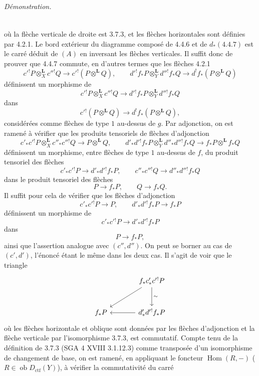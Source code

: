 \documentclass[11pt]{article}
\newenvironment{prooftext}[1][Proof]{\par\noindent\emph{#1.}\ }{\par\medskip}
\DeclareMathOperator{\Hom}{Hom}
\newcommand{\ob}{\operatorname{ob}}
\providecommand{\Dctf}{D_{\mathrm{ctf}}}
\providecommand{\Dctf}{D_{\mathrm{ctf}}}
\providecommand{\Hom}{\operatorname{Hom}}
\providecommand{\ob}{\operatorname{ob}}
\providecommand{\Hom}{\operatorname{Hom}}
\begin{document}
\begin{prooftext}[Démonstration]
\begin{equation}
\begin{tikzcd}[column sep=large,row sep=large]
\end{tikzcd}
\end{equation}
où la flèche verticale de droite est 3.7.3, et les flèches horizontales sont définies par 4.2.1. Le bord extérieur du diagramme composé de 4.4.6 et de $d_*(4.4.7)$ est le carré déduit de $(A)$ en inversant les flèches verticales. Il suffit donc de prouver que 4.4.7 commute, en d'autres termes que les flèches 4.2.1
\[
c'{}^!P\otimes_X^{\mathbf L}c''{}^!Q\longrightarrow c'{}^!(P\otimes^{\mathbf L}Q),\qquad
d'{}^!f_*P\otimes_Y^{\mathbf L}d''{}^!f_*Q\longrightarrow d^!f_*(P\otimes^{\mathbf L}Q)
\]
définissent un morphisme de
\[
c'{}^!P\otimes_X^{\mathbf L}c''{}^!Q\longrightarrow d'{}^!f_*P\otimes_Y^{\mathbf L}d''{}^!f_*Q
\]
dans
\[
c'{}^!(P\otimes^{\mathbf L}Q)\longrightarrow d^!f_*(P\otimes^{\mathbf L}Q),
\]
considérées comme flèches de type $1$ au-dessus de $g$. Par adjonction, on est ramené à vérifier que les produits tensoriels de flèches d'adjonction
\[
c'_*c'{}^!P\otimes_X^{\mathbf L}c''_*c''{}^!Q\longrightarrow P\otimes^{\mathbf L}Q,
\qquad
d'_*d'{}^!f_*P\otimes_Y^{\mathbf L}d''_*d''{}^!f_*Q
\longrightarrow f_*P\otimes^{\mathbf L}f_*Q
\]
définissent un morphisme, entre flèches de type $1$ au-dessus de $f$, du produit tensoriel des flèches
\[
c'_*c'{}^!P\longrightarrow d'_*d'{}^!f_*P,\qquad
c''_*c''{}^!Q\longrightarrow d''_*d''{}^!f_*Q
\]
dans le produit tensoriel des flèches
\[
P\longrightarrow f_*P,\qquad Q\longrightarrow f_*Q.
\]
Il suffit pour cela de vérifier que les flèches d'adjonction
\[
c'_*c'{}^!P\longrightarrow P,\qquad d'_*d'{}^!f_*P\longrightarrow f_*P
\]
définissent un morphisme de
\[
c'_*c'{}^!P\longrightarrow d'_*d'{}^!f_*P
\]
dans
\[
P\longrightarrow f_*P,
\]
ainsi que l'assertion analogue avec $(c'',d'')$. On peut se borner au cas de $(c',d')$, l'énoncé étant le même dans les deux cas. Il s'agit de voir que le triangle
\[
\begin{tikzcd}[column sep=large,row sep=large]
& f_*c'_*c'{}^!P \arrow[d,"\sim"]\arrow[dl]\\
f_*P & d'_*d'{}^!f_*P\arrow[l]
\end{tikzcd}
\]
où les flèches horizontale et oblique sont données par les flèches d'adjonction et la flèche verticale par l'isomorphisme 3.7.3, est commutatif. Compte tenu de la définition de 3.7.3 (SGA 4 XVIII 3.1.12.3) comme transposée d'un isomorphisme de changement de base, on est ramené, en appliquant le foncteur $\Hom(R,-)$ ($R\in\ob\Dctf(Y)$), à vérifier la commutativité du carré
\[
\begin{tikzcd}[column sep=large,row sep=large]

\end{tikzcd}\]
\end{prooftext}
\end{document}
